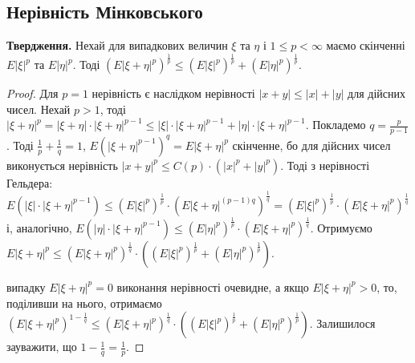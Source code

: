 \subsection{Нерівність Мінковського}
\noindent\textbf{Твердження.} Нехай для випадкових величин $\xi$ та $\eta$ і $1\leq p < \infty$ маємо скінченні
$E\left| \xi\right|^p$ та $E\left| \eta\right|^p$. Тоді
$\left(E\left| \xi + \eta\right|^p\right)^{\frac{1}{p}} \leq \left(E\left| \xi \right|^p\right)^{\frac{1}{p}}
+\left(E\left| \eta \right|^p\right)^{\frac{1}{p}}$.
\begin{proof}
    Для $p=1$ нерівність є наслідком нерівності $\left| x+y\right| \leq |x| + |y|$ для дійсних чисел.
    Нехай $p > 1$, тоді $\left| \xi + \eta\right|^p = |\xi + \eta| \cdot |\xi + \eta|^{p-1} \leq |\xi| \cdot |\xi + \eta|^{p-1} +
    |\eta| \cdot |\xi + \eta|^{p-1}$.
    Покладемо $q = \frac{p}{p-1}$. Тоді $\frac{1}{p} + \frac{1}{q} = 1$, $E\left(|\xi + \eta|^{p-1} \right)^{q} = E|\xi+ \eta|^p$ скінченне, бо 
    для дійсних чисел виконується нерівність $|x+y|^p \leq C(p) \cdot (|x|^p + |y|^p)$.
    Тоді з нерівності Гельдера: $E\left( |\xi|\cdot |\xi + \eta|^{p-1}\right) \leq
    \left( E|\xi|^p\right)^{\frac{1}{p}} \cdot \left( E |\xi + \eta|^{(p-1)q}\right)^{\frac{1}{q}} = 
    \left( E|\xi|^p\right)^{\frac{1}{p}} \cdot \left( E |\xi + \eta|^{p}\right)^{\frac{1}{q}}$ і,
    аналогічно, 
    $E\left( |\eta|\cdot |\xi + \eta|^{p-1}\right) \leq 
    \left( E|\eta|^p\right)^{\frac{1}{p}} \cdot \left( E |\xi + \eta|^{p}\right)^{\frac{1}{q}}$.
    Отримуємо $E\left| \xi + \eta\right|^p \leq \left( E |\xi + \eta|^{p}\right)^{\frac{1}{q}} \cdot 
    \left(\left(E|\xi|^p\right)^{\frac{1}{p}} + \left(E|\eta|^p\right)^{\frac{1}{p}}\right)$.
    
     випадку $E\left| \xi + \eta\right|^p = 0$ виконання нерівності очевидне, а якщо $E\left| \xi + \eta\right|^p > 0$, то, поділивши на нього, отримаємо
    $\left(E\left| \xi + \eta\right|^p\right)^{1 - \frac{1}{q}} \leq \left( E |\xi + \eta|^{p}\right)^{\frac{1}{q}} \cdot 
    \left(\left(E|\xi|^p\right)^{\frac{1}{p}} + \left(E|\eta|^p\right)^{\frac{1}{p}}\right)$.
    Залишилося зауважити, що $1 - \frac{1}{q} = \frac{1}{p}$.
\end{proof}